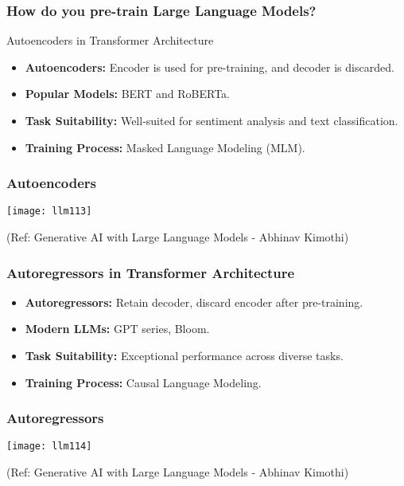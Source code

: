 \begin{frame}[fragile]\frametitle{How do you pre-train Large Language Models?}
Autoencoders in Transformer Architecture

\begin{itemize}
    \item \textbf{Autoencoders:} Encoder is used for pre-training, and decoder is discarded.
    \item \textbf{Popular Models:} BERT and RoBERTa.
    \item \textbf{Task Suitability:} Well-suited for sentiment analysis and text classification.
    \item \textbf{Training Process:} Masked Language Modeling (MLM).
\end{itemize}
\end{frame}

\begin{frame}[fragile]\frametitle{Autoencoders}

	\begin{center}
	\texttt{[image: llm113]}
	\end{center}

	{\tiny (Ref: Generative AI with Large Language Models - Abhinav  Kimothi)}

\end{frame}



\begin{frame}[fragile]\frametitle{Autoregressors in Transformer Architecture}
\begin{itemize}
    \item \textbf{Autoregressors:} Retain decoder, discard encoder after pre-training.
    \item \textbf{Modern LLMs:} GPT series, Bloom.
    \item \textbf{Task Suitability:} Exceptional performance across diverse tasks.
    \item \textbf{Training Process:} Causal Language Modeling.
\end{itemize}
\end{frame}

\begin{frame}[fragile]\frametitle{Autoregressors}

	\begin{center}
	\texttt{[image: llm114]}
	\end{center}

	{\tiny (Ref: Generative AI with Large Language Models - Abhinav  Kimothi)}

\end{frame}



